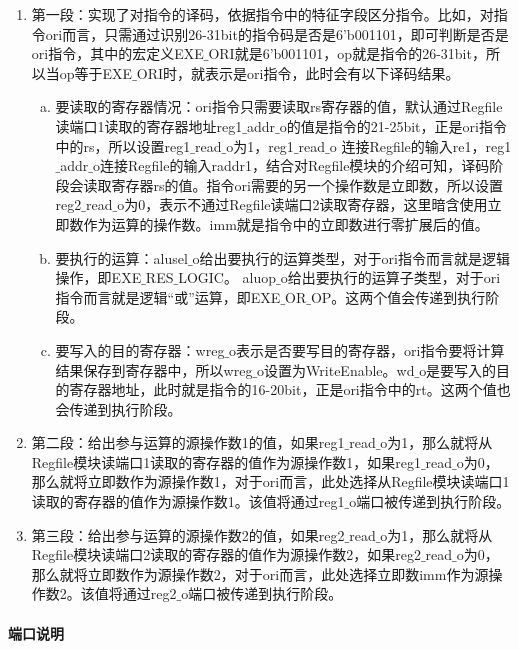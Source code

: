 \begin{enumerate}[(1)]
	\item 第一段：实现了对指令的译码，依据指令中的特征字段区分指令。比如，对指令ori而言，只需通过识别26-31bit的指令码是否是6'b001101，即可判断是否是ori指令，其中的宏定义EXE$\_$ORI就是6'b001101，op就是指令的26-31bit，所以当op等于EXE$\_$ORI时，就表示是ori指令，此时会有以下译码结果。
	
	\begin{enumerate}[(a)]
		\item 要读取的寄存器情况：ori指令只需要读取rs寄存器的值，默认通过Regfile读端口1读取的寄存器地址reg1$\_$addr$\_$o的值是指令的21-25bit，正是ori指令中的rs，所以设置reg1$\_$read$\_$o为1，reg1$\_$read$\_$o 连接Regfile的输入re1，reg1$\_$addr$\_$o连接Regfile的输入raddr1，结合对Regfile模块的介绍可知，译码阶段会读取寄存器rs的值。指令ori需要的另一个操作数是立即数，所以设置reg2$\_$read$\_$o为0，表示不通过Regfile读端口2读取寄存器，这里暗含使用立即数作为运算的操作数。imm就是指令中的立即数进行零扩展后的值。
		
		\item 要执行的运算：alusel$\_$o给出要执行的运算类型，对于ori指令而言就是逻辑操作，即EXE$\_$RES$\_$LOGIC。 aluop$\_$o给出要执行的运算子类型，对于ori指令而言就是逻辑“或”运算，即EXE$\_$OR$\_$OP。这两个值会传递到执行阶段。
		
		\item 要写入的目的寄存器：wreg$\_$o表示是否要写目的寄存器，ori指令要将计算结果保存到寄存器中，所以wreg$\_$o设置为WriteEnable。wd$\_$o是要写入的目的寄存器地址，此时就是指令的16-20bit，正是ori指令中的rt。这两个值也会传递到执行阶段。
	\end{enumerate}
	
	\item 第二段：给出参与运算的源操作数1的值，如果reg1$\_$read$\_$o为1，那么就将从Regfile模块读端口1读取的寄存器的值作为源操作数1，如果reg1$\_$read$\_$o为0，那么就将立即数作为源操作数1，对于ori而言，此处选择从Regfile模块读端口1读取的寄存器的值作为源操作数1。该值将通过reg1$\_$o端口被传递到执行阶段。
	
	\item 第三段：给出参与运算的源操作数2的值，如果reg2$\_$read$\_$o为1，那么就将从Regfile模块读端口2读取的寄存器的值作为源操作数2，如果reg2$\_$read$\_$o为0，那么就将立即数作为源操作数2，对于ori而言，此处选择立即数imm作为源操作数2。该值将通过reg2$\_$o端口被传递到执行阶段。
\end{enumerate}
\paragraph{端口说明}
\quad

